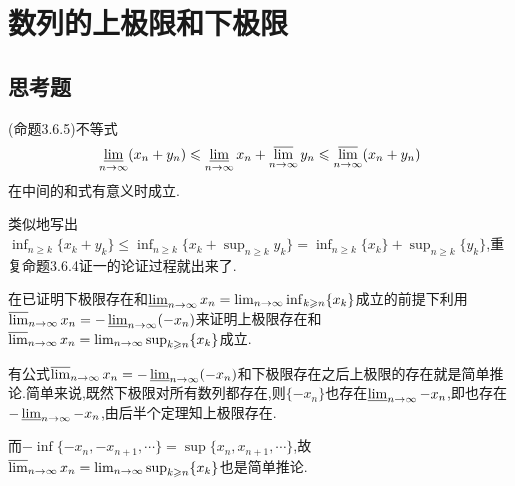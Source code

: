 
\section{数列的上极限和下极限}
 \subsection{思考题}
     \begin{example}
         (命题3.6.5)不等式
         \[
             \varliminf_{n\to\infty}(x_n+y_n) \leqslant \varliminf_{n\to\infty} x_n + \varlimsup_{n\to\infty} y_n \leqslant \varlimsup_{n\to\infty}(x_n+y_n)
         \]
         在中间的和式有意义时成立.
     \end{example}
     \begin{solution}
         类似地写出$\inf_{n \geqslant k}\{x_k+y_k\} \leqslant \inf_{n \geqslant k}\{x_k+\sup_{n \geqslant k}{y_k}\}=\inf_{n \geqslant k}\{x_k\}+\sup_{n \geqslant k}\{y_k\}$,重复命题3.6.4证一的论证过程就出来了.
     \end{solution}

     \begin{example}
         在已证明下极限存在和$\varliminf_{n\to\infty}x_n=\lim_{n\to\infty}\inf_{k\geqslant n}\{x_k\}$成立的前提下利用$\varlimsup_{n\to\infty}x_n=-\varliminf_{n\to\infty}(-x_n)$来证明上极限存在和$\varlimsup_{n\to\infty}x_n=\lim_{n\to\infty}\sup_{k\geqslant n}\{x_k\}$成立.
     \end{example}
     \begin{solution}
         有公式$\varlimsup_{n\to\infty}x_n=-\varliminf_{n\to\infty}(-x_n)$和下极限存在之后上极限的存在就是简单推论.简单来说,既然下极限对所有数列都存在,则$\{-x_n\}$也存在$\varliminf_{n\to\infty}-x_n$,即也存在$-\varliminf_{n\to\infty}-x_n$,由后半个定理知上极限存在.

         而$-\inf\{-x_n,-x_{n+1},\cdots\}=\sup\{x_n,x_{n+1},\cdots\}$,故$\varlimsup_{n\to\infty}x_n=\lim_{n\to\infty}\sup_{k\geqslant n}\{x_k\}$也是简单推论.
     \end{solution}

